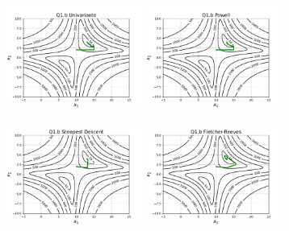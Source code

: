 \documentclass[10pt, a4paper]{article}
\begin{document}
\begin{figure}[H]
  \centering
  \begin{subfigure}[b]{\textwidth}
    \includegraphics[width=0.49\textwidth]{figuras/Q1.b_Univariante_P0=[10e2].pdf}
    \includegraphics[width=0.49\textwidth]{figuras/Q1.b_Powell_P0=[10e2].pdf}
  \end{subfigure}
  \begin{subfigure}[b]{\textwidth}
    \includegraphics[width=0.49\textwidth]{figuras/Q1.b_Steepest Descent_P0=[10e2].pdf}
    \includegraphics[width=0.49\textwidth]{figuras/Q1.b_Fletcher-Reeves_P0=[10e2].pdf}

\end{subfigure}
\end{figure}
\end{document}
